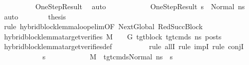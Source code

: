 \begin{isabellebody}
\ \ \ \ \ \ \ \ \isamarkupfalse%
\ OneStepResult\ \isamarkupfalse%
\ auto{\isacharbrackleft}{\kern0pt}{}{\isacharbrackright}{\kern0pt}\isanewline
\ \ \ \ \ \ \ \ \isamarkupfalse%
\ {\isachardoublequoteopen}{}{\isachardoublequoteclose}{\isacharparenleft}{\kern0pt}{}{\isacharparenright}{\kern0pt}\ {\isachardoublequoteopen}{}{\isachardoublequoteclose}{\isacharparenleft}{\kern0pt}{}{\isacharparenright}{\kern0pt}\ OneStepResult\ {\isacartoucheopen}s{}\ {\isacharequal}{\kern0pt}\ Normal\ ns{}{\isacartoucheclose}\ \isamarkupfalse%
\ auto\isanewline
\isanewline
\ \ \ \ \ \ \isamarkupfalse%
\ {\isacharquery}{\kern0pt}thesis\isanewline
\ \ \ \ \ \ \isamarkupfalse%
\ {\isacharparenleft}{\kern0pt}rule\ hybrid{\isacharunderscore}{\kern0pt}block{\isacharunderscore}{\kern0pt}lemma{\isacharunderscore}{\kern0pt}loop{\isacharunderscore}{\kern0pt}elim{\isacharbrackleft}{\kern0pt}OF\ NextGlobal\ RedSuccBlock{\isacharbrackright}{\kern0pt}{\isacharparenright}{\kern0pt}\ \isanewline
\ \ \ \ \ \ \ \ \isamarkupfalse%
\ {\isachardoublequoteopen}hybrid{\isacharunderscore}{\kern0pt}block{\isacharunderscore}{\kern0pt}lemma{\isacharunderscore}{\kern0pt}target{\isacharunderscore}{\kern0pt}verifies\ M\ {\isasymLambda}\ {\isasymGamma}\ {\isasymOmega}\ G{\isacharprime}{\kern0pt}\ tgt{\isacharunderscore}{\kern0pt}block\ tgt{\isacharunderscore}{\kern0pt}cmds{\isacharunderscore}{\kern0pt}{}\ ns{}\ posts{\isachardoublequoteclose}\isanewline
\ \ \ \ \ \ \ \ \ \ \isamarkupfalse%
\ hybrid{\isacharunderscore}{\kern0pt}block{\isacharunderscore}{\kern0pt}lemma{\isacharunderscore}{\kern0pt}target{\isacharunderscore}{\kern0pt}verifies{\isacharunderscore}{\kern0pt}def\isanewline
\ \ \ \ \ \ \ \ \isamarkupfalse%
\ {\isacharparenleft}{\kern0pt}rule\ allI{\isacharcomma}{\kern0pt}\ rule\ impI{\isacharcomma}{\kern0pt}\ rule\ conjI{\isacharparenright}{\kern0pt}\isanewline
\ \ \ \ \ \ \ \ \ \ \isamarkupfalse%
\ s{}{\isacharprime}{\kern0pt}\isanewline
\ \ \ \ \ \ \ \ \ \ \isamarkupfalse%
\ {\isachardoublequoteopen}M{\isacharcomma}{\kern0pt}{\isasymLambda}{\isacharcomma}{\kern0pt}{\isasymGamma}{\isacharcomma}{\kern0pt}{\isasymOmega}\ {\isasymturnstile}\ {\isasymlangle}tgt{\isacharunderscore}{\kern0pt}cmds{\isacharunderscore}{\kern0pt}{}{\isacharcomma}{\kern0pt}Normal\ ns{}{\isasymrangle}\ {\isacharbrackleft}{\kern0pt}{\isasymrightarrow}{\isacharbrackright}{\kern0pt}\ s{}{\isacharprime}{\kern0pt}{\isachardoublequoteclose}\isanewline

\end{isabellebody}
